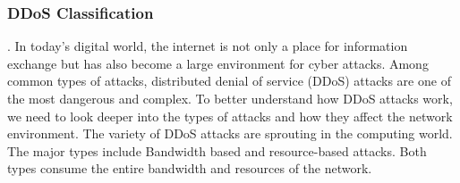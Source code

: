 \documentclass{ijitcs}
\begin{document}
\subsubsection{DDoS Classification}.
In today's digital world, the internet is not only a place for information exchange but has also become a large environment for cyber attacks. Among common types of attacks, distributed denial of service (DDoS) attacks are one of the most dangerous and complex. To better understand how DDoS attacks work, we need to look deeper into the types of attacks and how they affect the network environment. The variety of DDoS attacks are sprouting in the computing world. The major types include Bandwidth based and
resource-based attacks. Both types consume the entire bandwidth and resources of the network.
\end{document}
